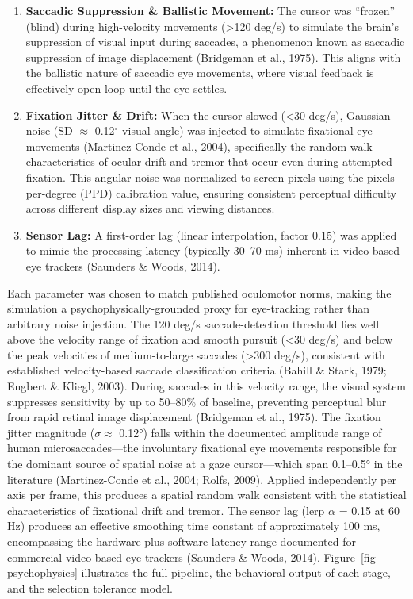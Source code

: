 \documentclass[
  11pt,
  11pt,
  letterpaper]{article}
\begin{document}
\begin{enumerate}
\def\labelenumi{\arabic{enumi}.}
\item
  \textbf{Saccadic Suppression \& Ballistic Movement:} The cursor was
  ``frozen'' (blind) during high-velocity movements (\textgreater120
  deg/s) to simulate the brain's suppression of visual input during
  saccades, a phenomenon known as saccadic suppression of image
  displacement (Bridgeman et al., 1975). This aligns with the ballistic
  nature of saccadic eye movements, where visual feedback is effectively
  open-loop until the eye settles.
\item
  \textbf{Fixation Jitter \& Drift:} When the cursor slowed (\textless30
  deg/s), Gaussian noise (SD \(\approx\) 0.12\(^\circ\) visual angle)
  was injected to simulate fixational eye movements (Martinez-Conde et
  al., 2004), specifically the random walk characteristics of ocular
  drift and tremor that occur even during attempted fixation. This
  angular noise was normalized to screen pixels using the
  pixels-per-degree (PPD) calibration value, ensuring consistent
  perceptual difficulty across different display sizes and viewing
  distances.
\item
  \textbf{Sensor Lag:} A first-order lag (linear interpolation, factor
  0.15) was applied to mimic the processing latency (typically 30--70
  ms) inherent in video-based eye trackers (Saunders \& Woods, 2014).
\end{enumerate}

Each parameter was chosen to match published oculomotor norms, making
the simulation a psychophysically-grounded proxy for eye-tracking rather
than arbitrary noise injection. The 120 deg/s saccade-detection
threshold lies well above the velocity range of fixation and smooth
pursuit (\textless30 deg/s) and below the peak velocities of
medium-to-large saccades (\textgreater300 deg/s), consistent with
established velocity-based saccade classification criteria (Bahill \&
Stark, 1979; Engbert \& Kliegl, 2003). During saccades in this velocity
range, the visual system suppresses sensitivity by up to 50--80\% of
baseline, preventing perceptual blur from rapid retinal image
displacement (Bridgeman et al., 1975). The fixation jitter magnitude
(\(\sigma \approx\) 0.12°) falls within the documented amplitude range
of human microsaccades---the involuntary fixational eye movements
responsible for the dominant source of spatial noise at a gaze
cursor---which span 0.1--0.5° in the literature (Martinez-Conde et al.,
2004; Rolfs, 2009). Applied independently per axis per frame, this
produces a spatial random walk consistent with the statistical
characteristics of fixational drift and tremor. The sensor lag (lerp
\(\alpha\) = 0.15 at 60 Hz) produces an effective smoothing time
constant of approximately 100 ms, encompassing the hardware plus
software latency range documented for commercial video-based eye
trackers (Saunders \& Woods, 2014). Figure~\ref{fig-psychophysics}
illustrates the full pipeline, the behavioral output of each stage, and
the selection tolerance model.
\end{document}
